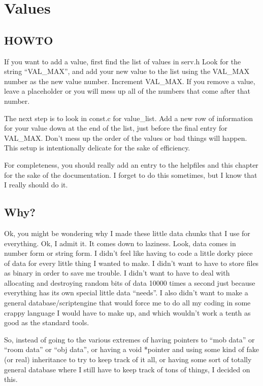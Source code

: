 \chapter{Values}

\section{HOWTO}

If you want to add a value, first find the list of values in 
serv.h Look for the string ``VAL\_MAX'', and add your new value
to the list using the VAL\_MAX number as the new value number.
Increment VAL\_MAX. If you remove a value, leave a placeholder
or you will mess up all of the numbers that come after that
number. 

The next step is to look in const.c for value\_list. Add a new
row of information for your value down at the end of the list,
just before the final entry for VAL\_MAX. Don't mess up the order
of the values or bad things will happen. This setup is intentionally
delicate for the sake of efficiency.

For completeness, you should really add an entry to the helpfiles
and this chapter for the sake of the documentation. I forget to
do this sometimes, but I know that I really should do it.

\section{Why?}

Ok, you might be wondering why I made these little data chunks that I
use for everything. Ok, I admit it. It comes down to laziness. Look,
data comes in number form or string form. I didn't feel like having to
code a little dorky piece of data for every little thing I wanted to
make. I didn't want to have to store files as binary in order to save
me trouble. I didn't want to have to deal with allocating and
destroying random bits of data 10000 times a second just because
everything has its own special little data ``needs''. I also didn't
want to make a general database/scriptengine that would force me to do
all my coding in some crappy language I would have to make up, and which
wouldn't work a tenth as good as the standard tools.

So, instead of going to the various extremes of having pointers to
``mob data'' or ``room data'' or ``obj data'', or having a void
*pointer and using some kind of fake (or real) inheritance to try to
keep track of it all, or having some sort of totally general database
where I still have to keep track of tons of things, I decided on this.

